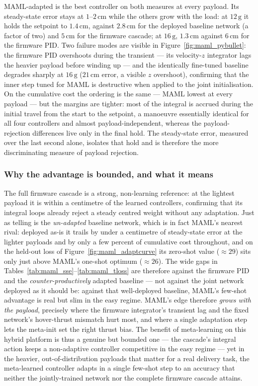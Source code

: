 \documentclass[11pt,a4paper]{article}
\theoremstyle{remark}
\numberwithin{equation}{section}
\begin{document}
MAML-adapted is the best controller on both measures at every payload. Its
steady-state error stays at $1$--$2\,\mathrm{cm}$ while the others grow with the
load: at $12\,\mathrm{g}$ it holds the setpoint to $1.4\,\mathrm{cm}$, against
$2.8\,\mathrm{cm}$ for the deployed baseline network (a factor of two) and
$5\,\mathrm{cm}$ for the firmware cascade; at $16\,\mathrm{g}$,
$1.3\,\mathrm{cm}$ against $6\,\mathrm{cm}$ for the firmware PID. Two failure
modes are visible in Figure~\ref{fig:maml_pybullet}: the firmware PID overshoots
during the transient --- its velocity-$z$ integrator lags the heavier payload
before winding up --- and the identically fine-tuned baseline degrades sharply
at $16\,\mathrm{g}$ ($21\,\mathrm{cm}$ error, a visible $z$ overshoot),
confirming that the inner step tuned for MAML is destructive when applied to the
joint initialisation. On the cumulative cost the ordering is the same --- MAML
lowest at every payload --- but the margins are tighter: most of the integral is
accrued during the initial travel from the start to the setpoint, a manoeuvre
essentially identical for all four controllers and almost payload-independent,
whereas the payload-rejection differences live only in the final hold. The
steady-state error, measured over the last second alone, isolates that hold and
is therefore the more discriminating measure of payload rejection.

\subsubsection*{Why the advantage is bounded, and what it means}

The full firmware cascade is a strong, non-learning reference: at the lightest
payload it is within a centimetre of the learned controllers, confirming that
its integral loops already reject a steady centred weight without any
adaptation. Just as telling is the \emph{un-adapted} baseline network, which is
in fact MAML's nearest rival: deployed as-is it trails by under a centimetre of
steady-state error at the lighter payloads and by only a few percent of
cumulative cost throughout, and on the held-out loss of
Figure~\ref{fig:maml_adaptcurve} its zero-shot value ($\approx\!29$) sits only
just above MAML's one-shot optimum ($\approx\!26$). The wide gaps in
Tables~\ref{tab:maml_sse}--\ref{tab:maml_tloss} are therefore against the
firmware PID and the \emph{counter-productively} adapted baseline --- not against
the joint network deployed as it should be: against that well-deployed baseline,
MAML's few-shot advantage is real but slim in the easy regime. MAML's edge
therefore \emph{grows with the payload}, precisely where
the firmware integrator's transient lag and the fixed network's hover-thrust
mismatch hurt most, and where a single adaptation step lets the meta-init set the
right thrust bias. The benefit of meta-learning on this hybrid platform is thus a
genuine but bounded one --- the cascade's integral action keeps a non-adaptive
controller competitive in the easy regime --- yet in the heavier,
out-of-distribution payloads that matter for a real delivery task, the
meta-learned controller adapts in a single few-shot step to an accuracy that
neither the jointly-trained network nor the complete firmware cascade attains.
\end{document}
